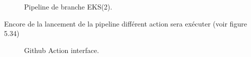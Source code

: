 {\begin{figure}[H]
\begin{center}
        \end{center}
        \caption{Pipeline de branche EKS(2).}
       \end{figure}
       \indent\indent Encore de la lancement de la pipeline différent action sera exécuter (voir figure 5.34)
       \begin{figure}[H]
           \begin{center}
           \end{center}
           \caption{Github Action interface.}
          \end{figure}
}
